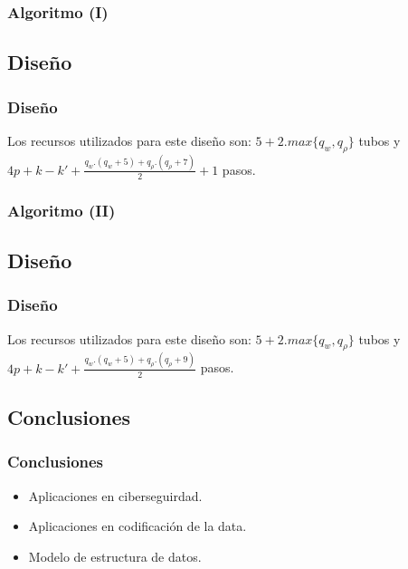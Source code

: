 \documentclass[12pt]{beamer}
\begin{document}
 \begin{frame}
     \frametitle{Algoritmo (I)}
     \begin{algorithmic}[1]
        \EndFor
        \State{$\cdots$}
        \EndProcedure
    \end{algorithmic}
 \end{frame}
 \begin{frame}
    \subsection{Diseño}
    \frametitle{Diseño}
    Los recursos utilizados para este diseño son: $5+2 . max\{q_w,q_\rho\}$ tubos y $4p+ k-k'+\frac{q_w.(q_w+5)+q_\rho.(q_\rho+7)}{2}+1$ pasos.
\end{frame}
 \begin{frame}
     \frametitle{Algoritmo (II)}
     \begin{algorithmic}[1]
        \State {$\cdots$}
            \Else
            \EndIf
        \EndWhile
        \EndProcedure
    \end{algorithmic}
 \end{frame}
 \begin{frame}
     \subsection{Diseño}
     \frametitle{Diseño}
     Los recursos utilizados para este diseño son: $5+2 . max\{q_w,q_\rho\}$ tubos y $4p+ k-k'+\frac{q_w.(q_w+5)+q_\rho.(q_\rho+9)}{2}$ pasos.
 \end{frame}
 \begin{frame}
     \section{Conclusiones}
     \frametitle{Conclusiones}
     \begin{itemize}
         \item Aplicaciones en ciberseguirdad.
         \item Aplicaciones en codificación de la data.
         \item Modelo de estructura de datos.
     \end{itemize}
 \end{frame}
\end{document}
